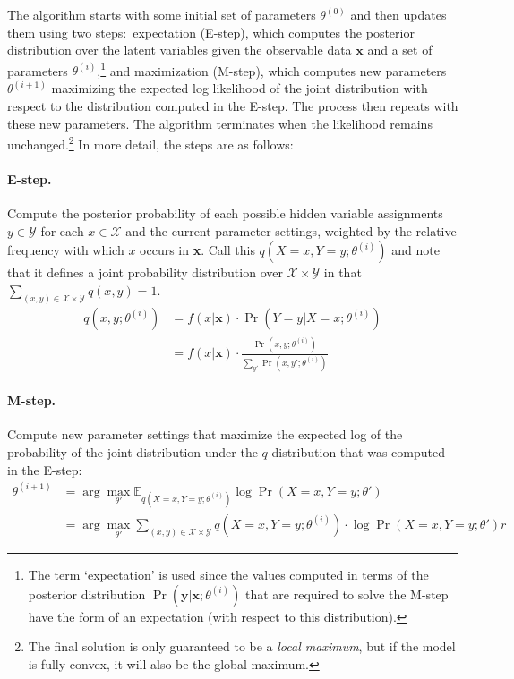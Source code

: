 \noindent The algorithm starts with some initial set of parameters
$\theta^{(0)}$ and then updates them using two steps:\ expectation
(E-step), which computes the posterior distribution over the latent
variables given the observable data $\textbf{x}$ and a set of
parameters $\theta^{(i)}$,\footnote{The term `expectation' is used
  since the values computed in terms of the posterior distribution
  $\Pr(\textbf{y}|\textbf{x};\theta^{(i)})$ that are required to solve
  the M-step have the form of an expectation (with respect to this
  distribution).} and maximization (M-step), which computes new
parameters $\theta^{(i+1)}$ maximizing the expected log likelihood of
the joint distribution with respect to the distribution computed in
the E-step.  The process then repeats with these new parameters.  The
algorithm terminates when the likelihood remains
unchanged.\footnote{The final solution is only guaranteed to be a
  \emph{local maximum}, but if the model is fully convex, it will also
  be the global maximum.} In more detail, the steps are as follows:

\paragraph{\textbf{E-step.}}
Compute the posterior probability of each possible hidden variable
assignments $y \in \mathcal{Y}$ for each $x \in \mathcal{X}$ and the
current parameter settings, weighted by the relative frequency with
which $x$ occurs in \textbf{x}.  Call this $q(X=x,Y=y;\theta^{(i)})$
and note that it defines a joint probability distribution over
$\mathcal{X} \times \mathcal{Y}$ in that $\sum_{(x,y) \in \mathcal{X}
  \times \mathcal{Y}} q(x,y) = 1$.
\begin{align}
q(x,y;\theta^{(i)}) & = f(x|\textbf{x}) \cdot \Pr(Y=y|X=x;\theta^{(i)}) \\
& = f(x|\textbf{x}) \cdot \frac{\Pr(x,y;\theta^{(i)})}{\sum_{y'}
  \Pr(x,y';\theta^{(i)})}
\end{align}

\paragraph{\textbf{M-step.}}
Compute new parameter settings that maximize the expected log of the
probability of the joint distribution under the $q$-distribution that
was computed in the E-step:
\begin{align}
\theta^{(i+1)} & = \arg \max_{\theta'} \mathbb{E}_{q(X=x,Y=y;\theta^{(i)})} \log \Pr(X=x,Y=y ; \theta') \\
& = \arg \max_{\theta'} \sum_{(x,y) \in \mathcal{X} \times \mathcal{Y}} q(X=x,Y=y;\theta^{(i)}) \cdot \log \Pr(X=x,Y=y ; \theta')r
\end{align}

